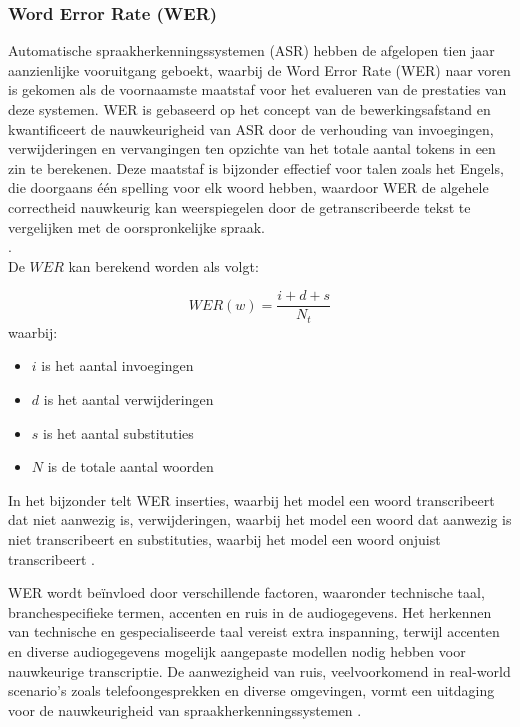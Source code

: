 \subsubsection{Word Error Rate (WER)}
Automatische spraakherkenningssystemen (ASR) hebben de afgelopen tien jaar aanzienlijke vooruitgang geboekt, waarbij de Word Error Rate (WER) naar voren is gekomen als de voornaamste maatstaf voor het evalueren van de prestaties van deze systemen. WER is gebaseerd op het concept van de bewerkingsafstand en kwantificeert de nauwkeurigheid van ASR door de verhouding van invoegingen, verwijderingen en vervangingen ten opzichte van het totale aantal tokens in een zin te berekenen. Deze maatstaf is bijzonder effectief voor talen zoals het Engels, die doorgaans één spelling voor elk woord hebben, waardoor WER de algehele correctheid nauwkeurig kan weerspiegelen door de getranscribeerde tekst te vergelijken met de oorspronkelijke spraak.\\
\autocite{Raghavan2022}.
\\De \(WER\) kan berekend worden als volgt:

\begin{equation}
   WER(w) = \frac{i + d + s}{N_t}
\end{equation}
waarbij:
\begin{itemize}
    \item \(i\) is het aantal invoegingen
    \item \(d\) is het aantal verwijderingen
    \item \(s\) is het aantal substituties
    \item \(N\) is de totale aantal woorden
\end{itemize}

In het bijzonder telt WER inserties, waarbij het model een woord transcribeert dat niet aanwezig is, verwijderingen, waarbij het model een woord dat aanwezig is niet transcribeert en substituties, waarbij het model een woord onjuist transcribeert
\autocite{OConnor2023}.


WER wordt beïnvloed door verschillende factoren, waaronder technische taal, branchespecifieke termen, accenten en ruis in de audiogegevens. Het herkennen van technische en gespecialiseerde taal vereist extra inspanning, terwijl accenten en diverse audiogegevens mogelijk aangepaste modellen nodig hebben voor nauwkeurige transcriptie. De aanwezigheid van ruis, veelvoorkomend in real-world scenario's zoals telefoongesprekken en diverse omgevingen, vormt een uitdaging voor de nauwkeurigheid van spraakherkenningssystemen \autocite{Gevirtz2018}.

